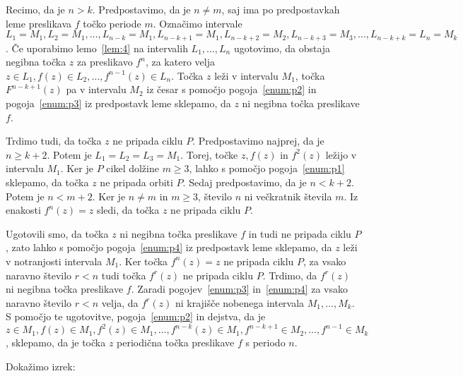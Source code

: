 \documentclass[../TG_magistrsko_delo_sections.tex]{subfiles}
\begin{document}
\begin{dokaz}
Recimo, da je $n>k$. Predpostavimo, da je $n \neq m$, saj ima po predpostavkah leme preslikava $f$ točko periode $m$. Označimo intervale $L_1 = M_1, L_2 = M_1, \dots, L_{n-k} = M_1, L_{n-k+1} = M_1, L_{n-k+2} = M_2,  L_{n-k+3} = M_3, \dots, L_{n-k+k} =L_n =M_k$. Če uporabimo lemo~\ref{lem:4} na intervalih $L_1, \dots, L_n$ ugotovimo, da obstaja negibna točka $z$ za preslikavo $f^n$, za katero velja $z \in L_1, f(z) \in L_2, \dots, f^{n-1}(z) \in L_{n}$. Točka $z$ leži v intervalu $M_1$, točka $F^{n-k+1}(z)$ pa v intervalu $M_2$ iz česar s pomočjo pogoja~\ref{enum:p2} in pogoja~\ref{enum:p3} iz predpostavk leme sklepamo, da $z$ ni negibna točka preslikave $f$. 

Trdimo tudi, da točka $z$ ne pripada ciklu $P$. Predpostavimo najprej, da je $n \geq k + 2$. Potem je $L_1 =L_2 = L_3 = M_1$. Torej, točke $z, f(z)$ in $f^2(z)$ ležijo v intervalu $M_1$. Ker je $P$ cikel dolžine $m \geq 3$, lahko s pomočjo pogoja~\ref{enum:p1} sklepamo, da točka $z$ ne pripada orbiti $P$. Sedaj predpostavimo, da je $n < k+2$. Potem je $n < m+2$. Ker je $n\neq m$ in $m \geq 3$, število $n$ ni večkratnik števila $m$. Iz enakosti $f^n(z) = z$ sledi, da točka $z$ ne pripada ciklu $P$.

Ugotovili smo, da točka $z$ ni negibna točka preslikave $f$ in tudi ne pripada ciklu $P$, zato lahko s pomočjo pogoja~\ref{enum:p4} iz predpostavk leme sklepamo, da $z$ leži v notranjosti intervala $M_1$. Ker točka $f^n(z) = z$ ne pripada ciklu $P$, za vsako naravno število $r < n$ tudi točka $f^r(z)$ ne pripada ciklu $P$. Trdimo, da $f^r(z)$ ni negibna točka preslikave $f$. Zaradi pogojev~\ref{enum:p3} in~\ref{enum:p4} za vsako naravno število $r < n$ velja, da $f^r(z)$ ni krajišče nobenega intervala $M_1, \dots, M_k$. S pomočjo te ugotovitve, pogoja~\ref{enum:p2} in dejstva, da je $z \in M_1, f(z) \in M_1, f^2(z) \in M_1, \dots, f^{n-k}(z) \in M_1, f^{n-k+1} \in M_2, \dots, f^{n-1} \in M_k$, sklepamo, da je točka $z$ periodična točka preslikave $f$ s periodo $n$.
\end{dokaz}


Dokažimo izrek:
\end{document}
